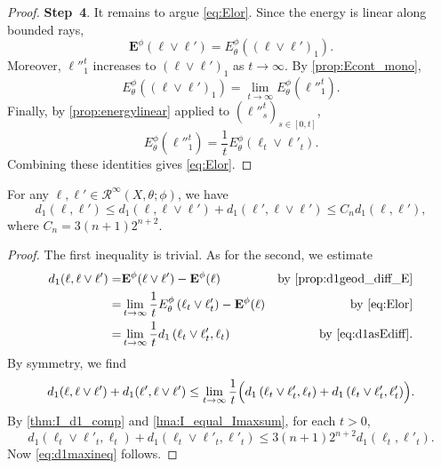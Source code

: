 \begin{proof}
    \textbf{Step~4}. It remains to argue \eqref{eq:Elor}. Since the energy is linear along bounded rays,
    \[
    \mathbf{E}^{\phi}(\ell\lor \ell')=E_{\theta}^{\phi}\left((\ell\lor \ell')_1\right).
    \]
    Moreover, $\ell''^t_1$ increases to $(\ell\lor \ell')_1$ as $t\to\infty$. By \cref{prop:Econt_mono},
    \[
    E_{\theta}^{\phi}\left((\ell\lor \ell')_1\right)=\lim_{t\to \infty} E_{\theta}^{\phi}\left(\ell''^t_1\right).
    \]
    Finally, by \cref{prop:energylinear} applied to $(\ell''^t_s)_{s\in [0,t]}$,
    \[
    E_{\theta}^{\phi}\left(\ell''^t_1\right)=\frac{1}{t}E_{\theta}^{\phi}\left(\ell_t\lor \ell'_t\right).
    \]
    Combining these identities gives \eqref{eq:Elor}.
\end{proof}


\begin{lemma}\label{lma:d1rayineq}
For any $\ell,\ell'\in \mathcal{R}^{\infty}(X,\theta;\phi)$, we have
    \begin{equation}\label{eq:d1maxineq}
    d_1(\ell,\ell')\leq d_1(\ell,\ell\lor\ell')+d_1(\ell',\ell\lor\ell')\leq C_nd_1(\ell,\ell'),
    \end{equation}
    where $C_n=3(n+1)2^{n+2}$.
\end{lemma}
\begin{proof}
    The first inequality is trivial. As for the second, we estimate
    \[
    \begin{aligned}
    d_1(\ell,\ell\lor\ell')=& \mathbf{E}^{\phi}(\ell\lor\ell')-\mathbf{E}^{\phi}(\ell)&\textup{by \cref{prop:d1geod_diff_E}}\\
    =&\lim_{t\to\infty} \frac{1}{t}E_{\theta}^{\phi}\left(\ell_t\lor \ell'_t\right)-\mathbf{E}^{\phi}(\ell)&\textup{by \eqref{eq:Elor}}\\
    =& \lim_{t\to\infty} \frac{1}{t} d_1\left(\ell_t\lor \ell'_t,\ell_t\right)&\textup{by \eqref{eq:d1asEdiff}}.
    \end{aligned}
    \]
    By symmetry, we find
    \[
    d_1(\ell,\ell\lor\ell')+d_1(\ell',\ell\lor\ell')\leq \lim_{t\to\infty} \frac{1}{t} \Bigl(d_1\left(\ell_t\lor \ell'_t,\ell_t\right)+d_1\left(\ell_t\lor \ell'_t,\ell'_t\right)\Bigr).
    \]
    By \cref{thm:I_d1_comp} and \cref{lma:I_equal_Imaxsum}, for each $t>0$,
    \[
    d_1\left(\ell_t\lor \ell'_t,\ell_t\right)+d_1\left(\ell_t\lor \ell'_t,\ell'_t\right)\leq 3(n+1)2^{n+2} d_1(\ell_t,\ell'_t).
    \]
    Now \eqref{eq:d1maxineq} follows.
\end{proof}



